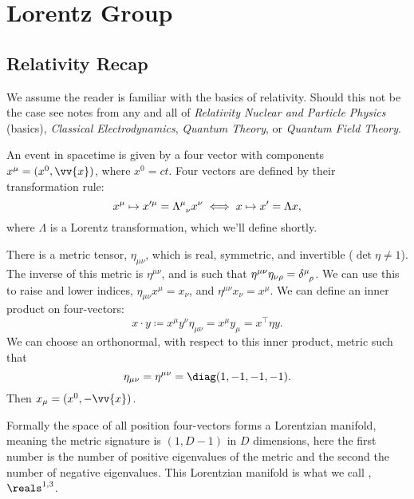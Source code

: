 \documentclass[fleqn]{NotesClass}
\newcommand{\course}[1]{\textit{#1}}
\newcommand{\minkowskiSpace}{\reals^{1,3}}
\newcommand{\minkowskiMetric}{\eta}
\newcommand{\trans}{\top}
\begin{document}
    \chapter{Lorentz Group}
    \section{Relativity Recap}
    \begin{rmk}
        We assume the reader is familiar with the basics of relativity.
        Should this not be the case see notes from any and all of \course{Relativity Nuclear and Particle Physics} (basics), \course{Classical Electrodynamics}, \course{Quantum Theory}, or \course{Quantum Field Theory}.
    \end{rmk}
    
    An event in spacetime is given by a four vector with components \(x^\mu = (x^0, \vv{x})\), where \(x^0 = ct\).
    Four vectors are defined by their transformation rule:
    \begin{equation}
        x^\mu \mapsto x'^\mu = \tensor{\Lambda}{^\mu_\nu}x^\nu \iff x \mapsto x' = \Lambda x,
    \end{equation}
    where \(\Lambda\) is a Lorentz transformation, which we'll define shortly.
    
    There is a metric tensor, \(\minkowskiMetric_{\mu\nu}\), which is real, symmetric, and invertible (\(\det\minkowskiMetric \ne 1\)).
    The inverse of this metric is \(\minkowskiMetric^{\mu\nu}\), and is such that \(\minkowskiMetric^{\mu\nu}\minkowskiMetric_{\nu\rho} = \tensor{\delta}{^\mu_\rho}\).
    We can use this to raise and lower indices, \(\minkowskiMetric_{\mu\nu}x^\mu = x_\nu\), and \(\minkowskiMetric^{\mu\nu}x_\nu = x^\mu\).
    We can define an inner product on four-vectors:
    \begin{equation}
        x \cdot y \coloneqq x^\mu y^\nu \minkowskiMetric_{\mu\nu} = x^\mu y_\mu = x^\trans \minkowskiMetric y.
    \end{equation}
    We can choose an orthonormal, with respect to this inner product, metric such that
    \begin{equation}
        \minkowskiMetric_{\mu\nu} = \minkowskiMetric^{\mu\nu} = \diag(1, -1, -1, -1).
    \end{equation}
    Then \(x_\mu = (x^0, -\vv{x})\).
    
    Formally the space of all position four-vectors forms a Lorentzian manifold, meaning the metric signature is \((1, D - 1)\) in \(D\) dimensions, here the first number is the number of positive eigenvalues of the metric and the second the number of negative eigenvalues.
    This Lorentzian manifold is what we call , \(\minkowskiSpace\)\index{R13@\(\minkowskiMetric\)|see{Minkowski space}}.
    
\end{document}
